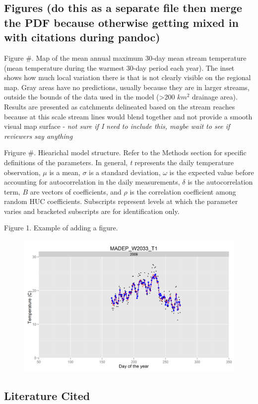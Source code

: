 \documentclass[]{article}
\begin{document}
\subsection{Figures (do this as a separate file then merge the PDF
because otherwise getting mixed in with citations during
pandoc)}\label{figures-do-this-as-a-separate-file-then-merge-the-pdf-because-otherwise-getting-mixed-in-with-citations-during-pandoc}

Figure \#. Map of the mean annual maximum 30-day mean stream temperature
(mean temperature during the warmest 30-day period each year). The inset
shows how much local variation there is that is not clearly visible on
the regional map. Gray areas have no predictions, usually because they
are in larger streams, outside the bounds of the data used in the model
(\textgreater{}200 \(km^2\) drainage area). Results are presented as
catchments delineated based on the stream reaches because at this scale
stream lines would blend together and not provide a smooth visual map
surface - \emph{not sure if I need to include this, maybe wait to see if
reviewers say anything}

Frigure \#. Hiearichal model structure. Refer to the Methods section for
specific definitions of the parameters. In general, \emph{t} represents
the daily temperature observation, \(\mu\) is a mean, \(\sigma\) is a
standard deviation, \(\omega\) is the expected value before accounting
for autocorrelation in the daily measurements, \(\delta\) is the
autocorrelation term, \(B\) are vectors of coefficients, and \(\rho\) is
the correlation coefficient among random HUC coefficients. Subscripts
represent levels at which the parameter varies and bracketed subscripts
are for identification only.

Figure 1. Example of adding a figure.

\begin{figure}[htbp]
\centering
\includegraphics{Figures/MADEP_W2033_T1.png}
\caption{}
\end{figure}

\subsection{Literature Cited}\label{literature-cited}


\end{document}
